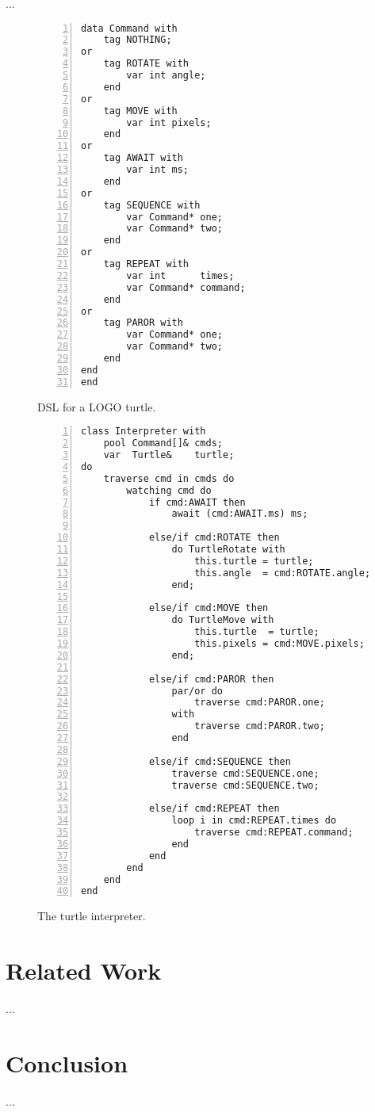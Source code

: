 \documentclass{acm_proc_article-sp}
\begin{document}
...

\begin{figure}%
\begin{lstlisting}[numbers=left,xleftmargin=3em]
data Command with
    tag NOTHING;
or
    tag ROTATE with
        var int angle;
    end
or
    tag MOVE with
        var int pixels;
    end
or
    tag AWAIT with
        var int ms;
    end
or
    tag SEQUENCE with
        var Command* one;
        var Command* two;
    end
or
    tag REPEAT with
        var int      times;
        var Command* command;
    end
or
    tag PAROR with
        var Command* one;
        var Command* two;
    end
end
end
\end{lstlisting}
\caption{ DSL for a LOGO turtle.
\label{lst.turtle.dsl}
}
\end{figure}

\begin{figure}%
\begin{lstlisting}[numbers=left,xleftmargin=3em]
class Interpreter with
    pool Command[]& cmds;
    var  Turtle&    turtle;
do
    traverse cmd in cmds do
        watching cmd do
            if cmd:AWAIT then
                await (cmd:AWAIT.ms) ms;

            else/if cmd:ROTATE then
                do TurtleRotate with
                    this.turtle = turtle;
                    this.angle  = cmd:ROTATE.angle;
                end;

            else/if cmd:MOVE then
                do TurtleMove with
                    this.turtle  = turtle;
                    this.pixels = cmd:MOVE.pixels;
                end;

            else/if cmd:PAROR then
                par/or do
                    traverse cmd:PAROR.one;
                with
                    traverse cmd:PAROR.two;
                end

            else/if cmd:SEQUENCE then
                traverse cmd:SEQUENCE.one;
                traverse cmd:SEQUENCE.two;

            else/if cmd:REPEAT then
                loop i in cmd:REPEAT.times do
                    traverse cmd:REPEAT.command;
                end
            end
        end
    end
end
\end{lstlisting}
\caption{ The turtle interpreter.
\label{lst.turtle.interpreter}
}
\end{figure}

\section{Related Work}

...

\section{Conclusion}

...



\balancecolumns
\end{document}
